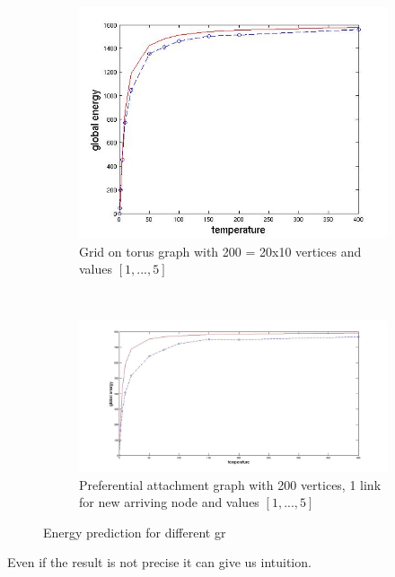 \documentclass[12pt]{report}
\begin{document}
\begin{figure}[t]
\begin{subfigure}[b]{0.4\textwidth}
    \end{subfigure}

    \begin{subfigure}[b]{0.4\textwidth}
        \includegraphics[width=\textwidth]{grid20x10}
        \caption{ Grid on torus graph with 200 = 20x10 vertices and values $[1, ..., 5]$ }

    \end{subfigure}   
    ~
    \begin{subfigure}[b]{0.4\textwidth}
        \includegraphics[width=\textwidth]{pa200x1}
        \caption{ Preferential attachment graph with 200 vertices, 1 link for new arriving node and values $[1, ..., 5]$ }

    \end{subfigure}
    
    \caption{Energy prediction for different gr}
    \label{fig:energyPrediction}
\end{figure}


Even if the result is not precise it can give us intuition.
\end{document}
